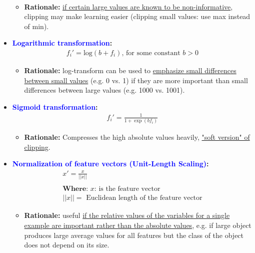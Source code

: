 \documentclass[12pt, a4paper]{article}
\begin{document}
\begin{itemize}
\begin{gather*}
  \end{gather*}
  \begin{itemize}
    \item \textbf{Rationale:} \uline{if certain large values are known to be non-informative}, clipping may make learning easier (clipping small values: use max instead of min).
  \end{itemize}
  \item \textbf{\textcolor{blue}{Logarithmic transformation}:}
  \begin{gather*}
    f_i' = \text{log}(b + f_i) \text{, for some constant } b > 0
  \end{gather*}
  \begin{itemize}
    \item \textbf{Rationale:} log-transform can be used to \uline{emphasize small differences between small values} (e.g. 0 vs. 1) if they are more important than small differences between large values (e.g. 1000 vs. 1001).
  \end{itemize}
  \item \textbf{\textcolor{blue}{Sigmoid transformation}:}
  \begin{gather*}
    f_i' = \frac{1}{1 + \exp{(b f_i)}}
  \end{gather*}
  \begin{itemize}
    \item \textbf{Rationale:} Compresses the high absolute values heavily, \uline{"soft version" of clipping}.
  \end{itemize}
  \item \textbf{\textcolor{blue}{Normalization of feature vectors (Unit-Length Scaling)}:}
  \begin{gather*}
    x' = \frac{x}{||x||} \\ \\
    \textbf{Where: } \text{$x$: } \text{is the feature vector} \\
    ||x|| = \text{ Euclidean length of the feature vector}
  \end{gather*}
  \begin{itemize}
    \item \textbf{Rationale:} useful \uline{if the relative values of the variables for a single example are important rather than the absolute values}, e.g. if large object produces large average values for all features but the class of the object does not depend on its size.
  \end{itemize}
\end{itemize}
\end{document}
